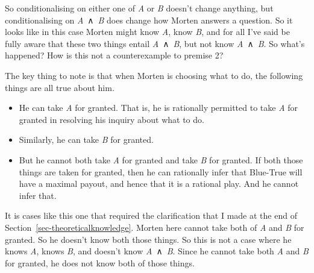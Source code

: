 \documentclass[
  10pt,
  letterpaper,
  twoside]{scrbook}
\providecommand{\tightlist}{%
  \setlength{\itemsep}{0pt}\setlength{\parskip}{0pt}}\usepackage{longtable,booktabs,array}
\begin{document}
So conditionalising on either one of \emph{A} or \emph{B} doesn't change
anything, but conditionalising on \emph{A}~∧~\emph{B} does change how
Morten answers a question. So it looks like in this case Morten might
know \emph{A}, know \emph{B}, and for all I've said be fully aware that
these two things entail \emph{A}~∧~\emph{B}, but not know
\emph{A}~∧~\emph{B}. So what's happened? How is this not a
counterexample to premise 2?

The key thing to note is that when Morten is choosing what to do, the
following things are all true about him.

\begin{itemize}
\tightlist
\item
  He can take \emph{A} for granted. That is, he is rationally permitted
  to take \emph{A} for granted in resolving his inquiry about what to
  do.
\item
  Similarly, he can take \emph{B} for granted.
\item
  But he cannot both take \emph{A} for granted and take \emph{B} for
  granted. If both those things are taken for granted, then he can
  rationally infer that Blue-True will have a maximal payout, and hence
  that it is a rational play. And he cannot infer that.
\end{itemize}

It is cases like this one that required the clarification that I made at
the end of Section~\ref{sec-theoreticalknowledge}. Morten here cannot
take both of \emph{A} and \emph{B} for granted. So he doesn't know both
those things. So this is not a case where he knows \emph{A}, knows
\emph{B}, and doesn't know \emph{A}~∧~\emph{B}. Since he cannot take
both \emph{A} and \emph{B} for granted, he does not know both of those
things.
\end{document}
